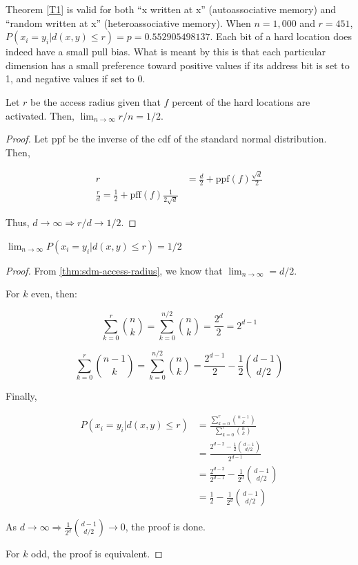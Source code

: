 Theorem \ref{T1} is valid for both ``x written at x'' (autoassociative memory) and ``random written at x'' (heteroassociative memory). When $n=1,000$ and $r=451$, $P(x_i = y_i | d(x, y) \le r) = p = 0.552905498137$.  Each bit of a hard location does indeed have a small pull bias.  What is meant by this is that each particular dimension has a small preference toward positive values if its address bit is set to 1, and negative values if set to 0.


\begin{theorem}
Let $r$ be the access radius given that $f$ percent of the hard locations are activated. Then, $\lim_{n \rightarrow \infty} r/n = 1/2$.
\label{thm:sdm-access-radius}
\end{theorem}
\begin{proof}
Let $\text{ppf}$ be the inverse of the cdf of the standard normal distribution. Then,

\begin{align}
r &= \frac{d}{2} + \text{ppf}(f) \frac{\sqrt{d}}{2} \\
\frac{r}{d} = \frac{1}{2} + \text{pff}(f) \frac{1}{2 \sqrt{d}}
\end{align}

Thus, $d \rightarrow \infty \Rightarrow r/d \rightarrow 1/2$.
\end{proof}

\begin{theorem}
$\lim_{n \rightarrow \infty} P(x_i = y_i | d(x, y) \le r) = 1/2$
\label{thm:sdm-autocorrelation-convergence}
\end{theorem}
\begin{proof}

From \ref{thm:sdm-access-radius}, we know that $\lim_{n \rightarrow \infty} = d/2$.

For $k$ even, then:

$$
\sum_{k=0}^{r} \binom{n}{k} = \sum_{k=0}^{n/2} \binom{n}{k} = \frac{2^d}{2} = 2^{d-1}
$$

$$
\sum_{k=0}^{r} \binom{n-1}{k} = \sum_{k=0}^{n/2} \binom{n}{k} = \frac{2^{d-1}}{2} - \frac{1}{2} \binom{d-1}{d/2}
$$

Finally,

\begin{align}
P(x_i = y_i | d(x, y) \le r) &= \frac{\sum_{k=0}^{r} \binom{n-1}{k}}{\sum_{k=0}^{r} \binom{n}{k}} \\
    &= \frac{2^{d-2} - \frac{1}{2} \binom{d-1}{d/2}}{2^{d-1}} \\
    &= \frac{2^{d-2}}{2^{d-1}} - \frac{1}{2^d} \binom{d-1}{d/2} \\
    &= \frac{1}{2} - \frac{1}{2^d} \binom{d-1}{d/2}
\end{align}

As $d \rightarrow \infty \Rightarrow \frac{1}{2^d} \binom{d-1}{d/2} \rightarrow 0$, the proof is done.

For $k$ odd, the proof is equivalent.

\end{proof}

